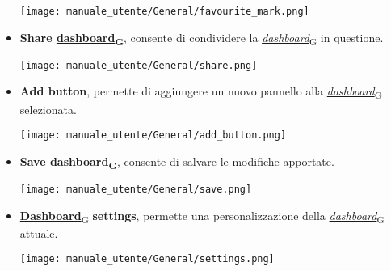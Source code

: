 \begin{itemize}
        \begin{center}
            \texttt{[image: manuale\_utente/General/favourite\_mark.png]}
        \end{center}
    \item \textbf{Share \href{https://7last.github.io/docs/pb/documentazione-interna/glossario\#dashboard}{dashboard\textsubscript{G}}}, consente di condividere la \href{https://7last.github.io/docs/pb/documentazione-interna/glossario\#dashboard}{\textit{dashboard}\textsubscript{G}} in questione.
        \begin{center}
            \texttt{[image: manuale\_utente/General/share.png]}
        \end{center}
    \item \textbf{Add button}, permette di aggiungere un nuovo pannello alla \href{https://7last.github.io/docs/pb/documentazione-interna/glossario\#dashboard}{\textit{dashboard}\textsubscript{G}} selezionata.
        \begin{center}
            \texttt{[image: manuale\_utente/General/add\_button.png]}
        \end{center}
    \item \textbf{Save \href{https://7last.github.io/docs/pb/documentazione-interna/glossario\#dashboard}{dashboard\textsubscript{G}}}, consente di salvare le modifiche apportate.
        \begin{center}
            \texttt{[image: manuale\_utente/General/save.png]}
        \end{center}
    \newpage
    \item \href{https://7last.github.io/docs/pb/documentazione-interna/glossario\#dashboard}{\textbf{Dashboard}\textsubscript{G}}\textbf{ settings}, permette una personalizzazione della \href{https://7last.github.io/docs/pb/documentazione-interna/glossario\#dashboard}{\textit{dashboard}\textsubscript{G}} attuale.
        \begin{center}
            \texttt{[image: manuale\_utente/General/settings.png]}

\end{center}
\end{itemize}
